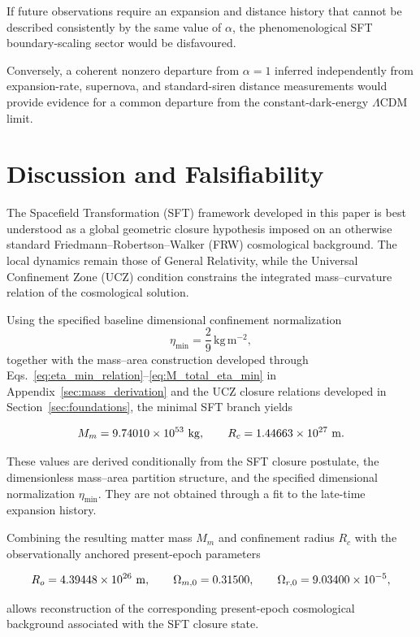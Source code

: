 \documentclass[12pt]{article}
\begin{document}
If future observations require an expansion and distance history that
cannot be described consistently by the same value of $\alpha$, the
phenomenological SFT boundary-scaling sector would be disfavoured.

Conversely, a coherent nonzero departure from $\alpha=1$ inferred
independently from expansion-rate, supernova, and standard-siren
distance measurements would provide evidence for a common departure
from the constant-dark-energy $\Lambda$CDM limit.


\section{Discussion and Falsifiability}
\label{sec:discussion}

The Spacefield Transformation (SFT) framework developed in this paper is
best understood as a global geometric closure hypothesis imposed on an
otherwise standard Friedmann--Robertson--Walker (FRW) cosmological
background. The local dynamics remain those of General Relativity,
while the Universal Confinement Zone (UCZ) condition constrains the
integrated mass--curvature relation of the cosmological solution.

Using the specified baseline dimensional confinement normalization
\[
\eta_{\min}
=
\frac{2}{9}\,\mathrm{kg\,m^{-2}},
\]
together with the mass--area construction developed through
Eqs.~\eqref{eq:eta_min_relation}--\eqref{eq:M_total_eta_min}
in Appendix~\ref{sec:mass_derivation} and the UCZ closure relations
developed in Section~\ref{sec:foundations},
the minimal SFT branch yields

\[
M_m = 9.74010\times10^{53}\ {\rm kg},
\qquad
R_c = 1.44663\times10^{27}\ {\rm m}.
\]

These values are derived conditionally from the SFT closure postulate,
the dimensionless mass--area partition structure, and the specified
dimensional normalization $\eta_{\min}$. They are not obtained through
a fit to the late-time expansion history.

Combining the resulting matter mass \(M_m\) and confinement radius
\(R_c\) with the observationally anchored present-epoch parameters

\[
R_o = 4.39448\times10^{26}\ {\rm m},
\qquad
\Omega_{m,0}=0.31500,
\qquad
\Omega_{r,0}=9.03400\times10^{-5},
\]

allows reconstruction of the corresponding present-epoch cosmological
background associated with the SFT closure state.
\end{document}
